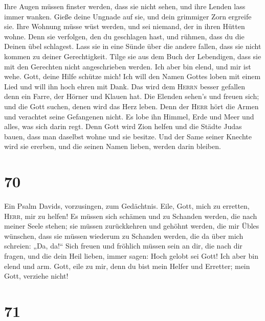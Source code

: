  Ihre Augen müssen finster werden, dass sie nicht sehen,
und ihre Lenden lass immer wanken.  Gieße deine Ungnade
auf sie, und dein grimmiger Zorn ergreife sie.  Ihre
Wohnung müsse wüst werden, und sei niemand, der in ihren Hütten wohne.
 Denn sie verfolgen, den du geschlagen hast, und rühmen,
dass du die Deinen übel schlagest.  Lass sie in eine
Sünde über die andere fallen, dass sie nicht kommen zu deiner
Gerechtigkeit.  Tilge sie aus dem Buch der Lebendigen,
dass sie mit den Gerechten nicht angeschrieben werden. 
Ich aber bin elend, und mir ist wehe. Gott, deine Hilfe schütze mich!
 Ich will den Namen Gottes loben mit einem Lied und will
ihn hoch ehren mit Dank.  Das wird dem \textsc{Herrn}
besser gefallen denn ein Farre, der Hörner und Klauen hat.
 Die Elenden sehen's und freuen sich; und die Gott
suchen, denen wird das Herz leben.  Denn der
\textsc{Herr} hört die Armen und verachtet seine Gefangenen nicht.
 Es lobe ihn Himmel, Erde und Meer und alles, was sich
darin regt.  Denn Gott wird Zion helfen und die Städte
Judas bauen, dass man daselbst wohne und sie besitze. 
Und der Same seiner Knechte wird sie ererben, und die seinen Namen
lieben, werden darin bleiben.

\hypertarget{section-69}{%
\section{70}\label{section-69}}

 Ein Psalm Davids, vorzusingen, zum Gedächtnis.
 Eile, Gott, mich zu erretten, \textsc{Herr}, mir zu
helfen!  Es müssen sich schämen und zu Schanden werden,
die nach meiner Seele stehen; sie müssen zurückkehren und gehöhnt
werden, die mir Übles wünschen,  dass sie müssen wiederum
zu Schanden werden, die da über mich schreien: „Da, da!{}``
 Sich freuen und fröhlich müssen sein an dir, die nach dir
fragen, und die dein Heil lieben, immer sagen: Hoch gelobt sei Gott!
 Ich aber bin elend und arm. Gott, eile zu mir, denn du
bist mein Helfer und Erretter; mein Gott, verziehe nicht!

\hypertarget{section-70}{%
\section{71}\label{section-70}}

